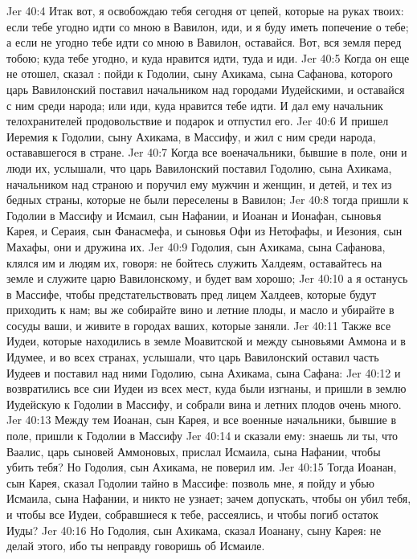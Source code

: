 \vs Jer 40:4 Итак вот, я освобождаю тебя сегодня от цепей, которые на руках твоих: если тебе угодно идти со мною в Вавилон, иди, и я буду иметь попечение о тебе; а если не угодно тебе идти со мною в Вавилон, оставайся. Вот, вся земля перед тобою; куда тебе угодно, и куда нравится идти, туда и иди.
\vs Jer 40:5 Когда он еще не отошел, сказал : пойди к Годолии, сыну Ахикама, сына Сафанова, которого царь Вавилонский поставил начальником над городами Иудейскими, и оставайся с ним среди народа; или иди, куда нравится тебе идти. И дал ему начальник телохранителей продовольствие и подарок и отпустил его.
\vs Jer 40:6 И пришел Иеремия к Годолии, сыну Ахикама, в Массифу, и жил с ним среди народа, остававшегося в стране.
\vs Jer 40:7 Когда все военачальники, бывшие в поле, они и люди их, услышали, что царь Вавилонский поставил Годолию, сына Ахикама, начальником над страною и поручил ему мужчин и женщин, и детей, и тех из бедных страны, которые не были переселены в Вавилон;
\vs Jer 40:8 тогда пришли к Годолии в Массифу и Исмаил, сын Нафании, и Иоанан и Ионафан, сыновья Карея, и Сераия, сын Фанасмефа, и сыновья Офи из Нетофафы, и Иезония, сын Махафы, они и дружина их.
\vs Jer 40:9 Годолия, сын Ахикама, сына Сафанова, клялся им и людям их, говоря: не бойтесь служить Халдеям, оставайтесь на земле и служите царю Вавилонскому, и будет вам хорошо;
\vs Jer 40:10 а я останусь в Массифе, чтобы предстательствовать пред лицем Халдеев, которые будут приходить к нам; вы же собирайте вино и летние плоды, и масло и убирайте в сосуды ваши, и живите в городах ваших, которые заняли.
\vs Jer 40:11 Также все Иудеи, которые находились в земле Моавитской и между сыновьями Аммона и в Идумее, и во всех странах, услышали, что царь Вавилонский оставил часть Иудеев и поставил над ними Годолию, сына Ахикама, сына Сафана:
\vs Jer 40:12 и возвратились все сии Иудеи из всех мест, куда были изгнаны, и пришли в землю Иудейскую к Годолии в Массифу, и собрали вина и летних плодов очень много.
\vs Jer 40:13 Между тем Иоанан, сын Карея, и все военные начальники, бывшие в поле, пришли к Годолии в Массифу
\vs Jer 40:14 и сказали ему: знаешь ли ты, что Ваалис, царь сыновей Аммоновых, прислал Исмаила, сына Нафании, чтобы убить тебя? Но Годолия, сын Ахикама, не поверил им.
\vs Jer 40:15 Тогда Иоанан, сын Карея, сказал Годолии тайно в Массифе: позволь мне, я пойду и убью Исмаила, сына Нафании, и никто не узнает; зачем допускать, чтобы он убил тебя, и чтобы все Иудеи, собравшиеся к тебе, рассеялись, и чтобы погиб остаток Иуды?
\vs Jer 40:16 Но Годолия, сын Ахикама, сказал Иоанану, сыну Карея: не делай этого, ибо ты неправду говоришь об Исмаиле.
